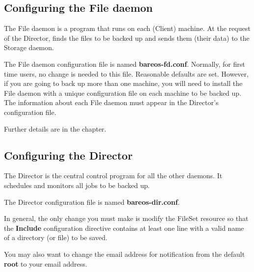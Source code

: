\subsection{Configuring the File daemon}

The File daemon is a program that runs on each (Client) machine. At the
request of the Director, finds the files to be backed up and sends them (their
data) to the Storage daemon.

The File daemon configuration file is named {\bf
bareos-fd.conf}. Normally, for first time users, no change is needed to this
file. Reasonable defaults are set. However, if you are going to back up more
than one machine, you will need to install the File daemon with a unique
configuration file on each machine to be backed up. The information about each
File daemon must appear in the Director's configuration file.

Further details are in the
 chapter.

\subsection{Configuring the Director}

The Director is the central control program for all the other daemons. It
schedules and monitors all jobs to be backed up.

The Director configuration file is named {\bf bareos-dir.conf}.

In general, the only change you must make is modify the FileSet resource so
that the {\bf Include} configuration directive contains at least one line with
a valid name of a directory (or file) to be saved.


You may also want to change the email address for notification from the
default {\bf root} to your email address.

